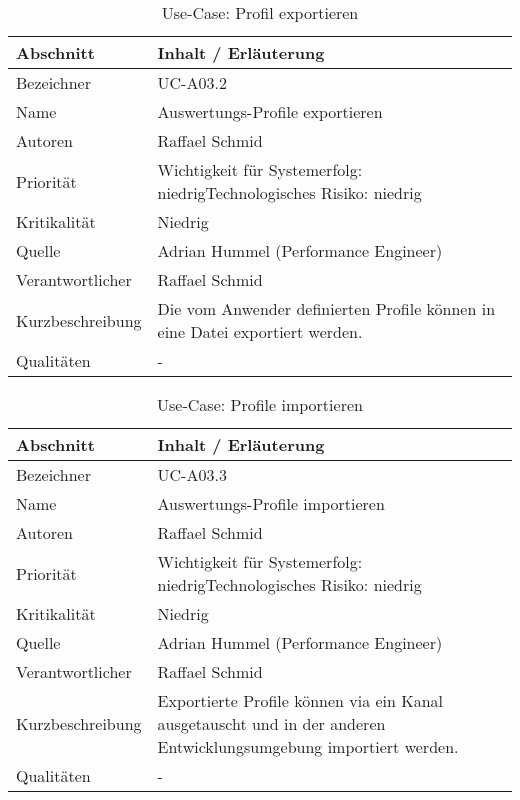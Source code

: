 \begin{longtable}{|p{4cm}|p{10.5cm}|}
\caption{Use-Case: Profil exportieren }\\\hline
   \textbf{Abschnitt} & \textbf{Inhalt / Erläuterung} \\\hline
   Bezeichner & UC-A03.2\\\hline
   Name & Auswertungs-Profile exportieren\\\hline
   Autoren & Raffael Schmid\\\hline
   Priorität & Wichtigkeit für Systemerfolg: niedrig\newline Technologisches Risiko: niedrig\\\hline
   Kritikalität & Niedrig\\\hline
   Quelle & Adrian Hummel (Performance Engineer)\\\hline
   Verantwortlicher & Raffael Schmid\\\hline
   Kurzbeschreibung & Die vom Anwender definierten Profile können in eine Datei exportiert werden.\\\hline
   Qualitäten & -\\\hline
\end{longtable}

\begin{longtable}{|p{4cm}|p{10.5cm}|}
\caption{Use-Case: Profile importieren }\\\hline
   \textbf{Abschnitt} & \textbf{Inhalt / Erläuterung} \\\hline
   Bezeichner & UC-A03.3\\\hline
   Name & Auswertungs-Profile importieren\\\hline
   Autoren & Raffael Schmid\\\hline
   Priorität & Wichtigkeit für Systemerfolg: niedrig\newline Technologisches Risiko: niedrig\\\hline
   Kritikalität & Niedrig\\\hline
   Quelle & Adrian Hummel (Performance Engineer)\\\hline
   Verantwortlicher & Raffael Schmid\\\hline
   Kurzbeschreibung & Exportierte Profile können via ein Kanal ausgetauscht und in der anderen Entwicklungsumgebung importiert werden. \\\hline
   Qualitäten & -\\\hline
\end{longtable}

